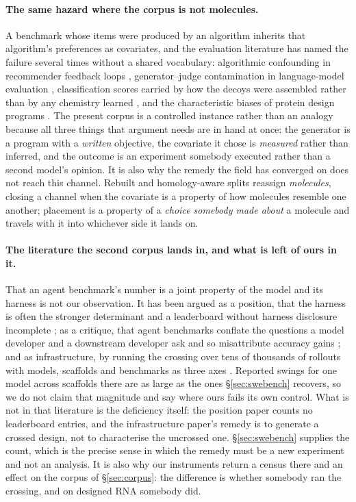 \documentclass[11pt]{article}
\begin{document}
\paragraph{The same hazard where the corpus is not molecules.} A benchmark whose items were
produced by an algorithm inherits that algorithm's preferences as covariates, and the evaluation
literature has named the failure several times without a shared vocabulary: algorithmic confounding
in recommender feedback loops \citep{chaney2018algorithmic}, generator--judge contamination in
language-model evaluation \citep{li2025preference}, classification scores carried by how the decoys
were assembled rather than by any chemistry learned \citep{wallach2018most}, and the characteristic
biases of protein design programs \citep{protdbench2026}. The present corpus is a controlled
instance rather than an analogy because all three things that argument needs are in hand at once:
the generator is a program with a \emph{written} objective, the covariate it chose is
\emph{measured} rather than inferred, and the outcome is an experiment somebody executed rather
than a second model's opinion. It is also why the remedy the field has converged on does not reach
this channel. Rebuilt and homology-aware splits \citep{chanrg2026,szikszai2026gauging} reassign \emph{molecules},
closing a channel when the covariate is a property of how molecules resemble one another; placement
is a property of a \emph{choice somebody made about} a molecule and travels with it into whichever
side it lands on.

\paragraph{The literature the second corpus lands in, and what is left of ours in it.} That an
agent benchmark's number is a joint property of the model and its harness is not our observation.
It has been argued as a position, that the harness is often the stronger determinant and a
leaderboard without harness disclosure incomplete \citep{zhang2026harness}; as a critique, that
agent benchmarks conflate the questions a model developer and a downstream developer ask and so
misattribute accuracy gains \citep{kapoor2024agents}; and as infrastructure, by running the crossing
over tens of thousands of rollouts with models, scaffolds and benchmarks as three axes
\citep{hal2025holistic}. Reported swings for one model across scaffolds there are as large as
the ones \S\ref{sec:swebench} recovers, so we do not claim that magnitude and say where ours fails
its own control. What is not in that literature is the deficiency itself: the position paper counts
no leaderboard entries, and the infrastructure paper's remedy is to generate a crossed design, not
to characterise the uncrossed one. \S\ref{sec:swebench} supplies the count, which is the precise sense in which the remedy must be a
new experiment and not an analysis. It is also why our instruments return a
census there and an effect on the corpus of \S\ref{sec:corpus}: the difference is whether somebody
ran the crossing, and on designed RNA somebody did.
\end{document}
